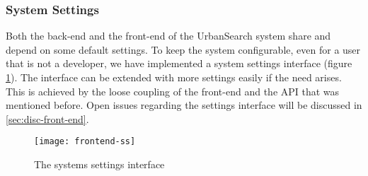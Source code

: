 \subsubsection{System Settings}

Both the back-end and the front-end of the UrbanSearch system share and depend on some default settings. To keep the system configurable, even for a user that is not a developer, we have implemented a system settings interface (figure \ref{fig:frontend-ss}). The interface can be extended with more settings easily if the need arises. This is achieved by the loose coupling of the front-end and the API that was mentioned before. Open issues regarding the settings interface will be discussed in \ref{sec:disc-front-end}.


\begin{figure}[H]
\centering
\texttt{[image: frontend-ss]}
\caption{The systems settings interface}
\label{fig:frontend-ss}
\end{figure}